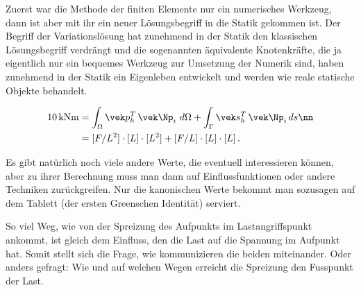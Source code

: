{Zuerst war die Methode der finiten Elemente nur ein numerisches Werkzeug, dann ist aber mit ihr ein neuer L\"{o}sungsbegriff in die Statik gekommen ist. Der Begriff der Variationsl\"{o}sung hat zunehmend in der Statik den klassischen L\"{o}sungsbegriff verdr\"{a}ngt und die sogenannten \"{a}quivalente Knotenkr\"{a}fte, die ja eigentlich nur ein bequemes Werkzeug  zur Umsetzung der Numerik sind, haben zunehmend in der Statik ein Eigenleben entwickelt und werden wie reale statische Objekte behandelt.


\begin{align}
10\,\text{kNm} &= \int_{\Omega} \vek p_h^T\,\vek \Np_i\,\,d\Omega + \int_{\Gamma} \vek s_h^T\,\vek \Np_i\,ds \nn \\
&= [F/L^2] \cdot [L] \cdot [L^2] + [F/L] \cdot [L] \cdot [L]\,.
\end{align}

Es gibt nat\"{u}rlich noch viele andere Werte, die eventuell interessieren k\"{o}nnen, aber zu ihrer Berechnung muss man dann auf Einflussfunktionen oder andere Techniken zur\"{u}ckgreifen. Nur die kanonischen Werte bekommt man sozusagen auf dem Tablett (der ersten Greenschen Identit\"{a}t) serviert.


So viel Weg, wie von der Spreizung des Aufpunkts im Lastangriffspunkt ankommt, ist gleich dem Einfluss, den die Last auf die Spannung im Aufpunkt hat. Somit stellt sich die Frage, wie kommunizieren die beiden miteinander. Oder anders gefragt: Wie und auf welchen Wegen erreicht die Spreizung den Fusspunkt der Last.

}
